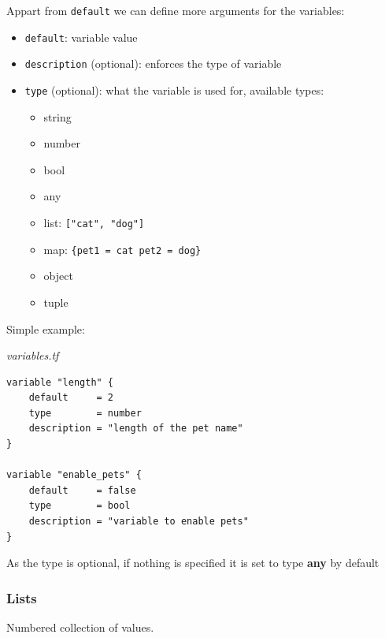 \documentclass{article}
\newenvironment{blocktemplate}[1]{%
    \tcolorbox[beamer,%
    noparskip,breakable,
    colframe=Blue,%
    colbacklower=LimeGreen!75!LightGreen,%
    title=#1]}%
    {\endtcolorbox}
\newenvironment{codetemplate}[1][]{%
  \mybasecolorbox[#1]
  \itshape
}{%
  \endmybasecolorbox
}
\begin{document}
Appart from \verb+default+ we can define more arguments for the variables:

\begin{itemize}
    \item \verb+default+: variable value
    \item \verb+description+ (optional): enforces the type of variable
    \item \verb+type+ (optional): what the variable is used for, available types:
    \begin{itemize}
        \item string
        \item number
        \item bool
        \item any
        \item list: \verb+["cat", "dog"]+
        \item map: \verb+{pet1 = cat pet2 = dog}+
        \item object
        \item tuple
    \end{itemize}
\end{itemize}

Simple example:

\begin{codetemplate}{variables.tf}
\begin{verbatim}
variable "length" {
    default     = 2
    type        = number
    description = "length of the pet name"
}

variable "enable_pets" {
    default     = false
    type        = bool
    description = "variable to enable pets"
}
\end{verbatim}
\end{codetemplate}

\begin{blocktemplate}{Note}
As the type is optional, if nothing is specified it is set to type \textbf{any} by default
\end{blocktemplate}

\subsubsection{Lists} 
Numbered collection of values.
\end{document}

